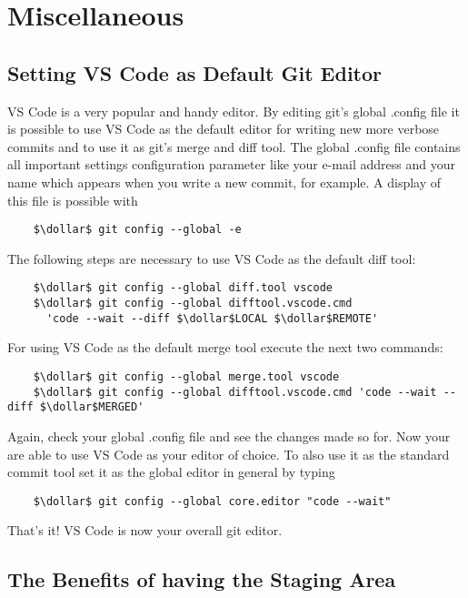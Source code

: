 \chapter{Miscellaneous}
\label{chapter:Miscellaneous}

\section{Setting VS Code as Default Git Editor}
\label{chapter:Miscellaneous.1}

VS Code is a very popular and handy editor. By editing git's global .config file it is possible to use VS Code as the default editor for writing 
new more verbose commits and to use it as git's merge and diff tool. The global .config file contains all important settings configuration parameter
like your e-mail address and your name which appears when you write a new commit, for example.
A display of this file is possible with
\begin{lstlisting}
	$\dollar$ git config --global -e
\end{lstlisting} 
The following steps are necessary to use VS Code as the default diff tool:
\begin{lstlisting}
	$\dollar$ git config --global diff.tool vscode
	$\dollar$ git config --global difftool.vscode.cmd 
	  'code --wait --diff $\dollar$LOCAL $\dollar$REMOTE'
\end{lstlisting}
For using VS Code as the default merge tool execute the next two commands:
\begin{lstlisting}
	$\dollar$ git config --global merge.tool vscode
	$\dollar$ git config --global difftool.vscode.cmd 'code --wait --diff $\dollar$MERGED'
\end{lstlisting}
Again, check your global .config file and see the changes made so for. Now your are able to use 
VS Code as your editor of choice. To also use it as the standard commit tool set it as the global editor in general by typing 
\begin{lstlisting}
	$\dollar$ git config --global core.editor "code --wait"
\end{lstlisting}
That's it! VS Code is now your overall git editor.


\section{The Benefits of having the Staging Area}
\label{chapter:Miscellaneous.2}

